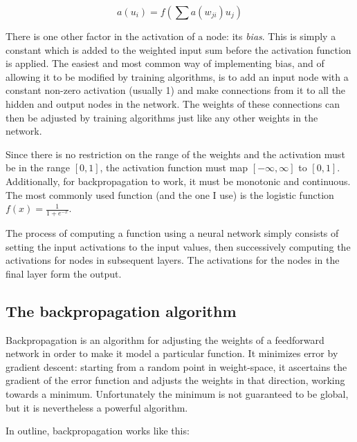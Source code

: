 \[ a(u_i) = f(\sum a(w_{ji})u_j) \]

There is one other factor in the activation of a node: its
\emph{bias}. This is simply a constant which is added to the weighted
input sum before the activation function is applied. The easiest and
most common way of implementing bias, and of allowing it to be
modified by training algorithms, is to add an input node with a
constant non-zero activation (usually 1) and make connections from it
to all the hidden and output nodes in the network. The weights of
these connections can then be adjusted by training algorithms just
like any other weights in the network.

Since there is no restriction on the range of the weights and the
activation must be in the range $[0,1]$, the activation function must
map $[-\infty, \infty]$ to $[0,1]$. Additionally, for backpropagation
to work, it must be monotonic and continuous. The most commonly used
function (and the one I use) is the logistic function $f(x) =
\frac{1}{1 + e^{-x}}$.

The process of computing a function using a neural network simply
consists of setting the input activations to the input values, then
successively computing the activations for nodes in subsequent
layers. The activations for the nodes in the final layer form the
output.

\subsection{The backpropagation algorithm}

Backpropagation is an algorithm for adjusting the weights of a
feedforward network in order to make it model a particular function.
It minimizes error by gradient descent: starting from a random point
in weight-space, it ascertains the gradient of the error function and
adjusts the weights in that direction, working towards a minimum.
Unfortunately the minimum is not guaranteed to be global, but it is
nevertheless a powerful algorithm.

In outline, backpropagation works like this:

